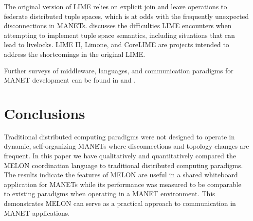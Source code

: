 \documentclass{llncs}
\begin{document}
The original version of LIME relies on explicit join and leave operations to federate distributed tuple spaces, which is at odds with the frequently unexpected disconnections in MANETs. \cite{limerevisted} discusses the difficulties LIME encounters when attempting to implement tuple space semantics, including situations that can lead to livelocks. LIME II\cite{lime2}, Limone\cite{limone}, and CoreLIME\cite{corelime} are projects intended to address the shortcomings in the original LIME.

Further surveys of middleware, languages, and communication paradigms for MANET development can be found in \cite{mine} and \cite{mwtrends}.

\section{Conclusions}\label{sec:conclusions}

Traditional distributed computing paradigms were not designed to operate in dynamic, self-organizing MANETs where disconnections and topology changes are frequent. In this paper we have qualitatively and quantitatively compared the MELON coordination language to traditional distributed computing paradigms. The results indicate the features of MELON are useful in a shared whiteboard application for MANETs while its performance was measured to be comparable to existing paradigms when operating in a MANET environment. This demonstrates MELON can serve as a practical approach to communication in MANET applications.



\end{document}
